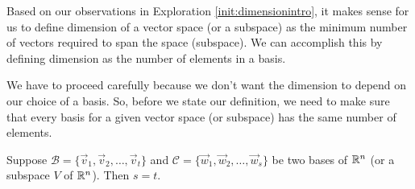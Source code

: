\documentclass{ximera}
\begin{document}
Based on our observations in Exploration \ref{init:dimensionintro}, it makes sense for us to define dimension of a vector space (or a subspace) as the minimum number of vectors required to span the space (subspace).  We can accomplish this by defining dimension as the number of elements in a basis.

We have to proceed carefully because we don't want the dimension to depend on our choice of a basis.  So, before we state our definition, we need to make sure that every basis for a given vector space (or subspace) has the same number of elements.

\begin{theorem}\label{th:dimwelldefined}
Suppose $\mathcal{B}=\{\vec{v}_1, \vec{v}_2,\ldots ,\vec{v}_t\}$ and $\mathcal{C}=\{\vec{w}_1, \vec{w}_2,\ldots ,\vec{w}_s\}$ be two bases of $\mathbb{R}^n$ (or a subspace $V$ of $\mathbb{R}^n$).  Then $s=t$.
\end{theorem}
\end{document}
